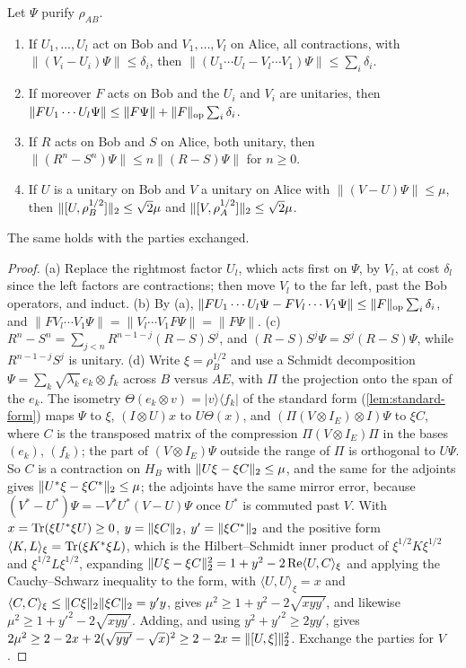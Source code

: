\begin{lemma}\label{lem:transfer-parties}
Let $\Psi$ purify $\rho_{AB}$.
\begin{enumerate}[label=(\alph*),itemsep=1pt]
\item If $U_1,\dots,U_l$ act on Bob and $V_1,\dots,V_l$ on Alice, all contractions, with $\|(V_i-U_i)\Psi\|\le\delta_i$,
then $\|(U_1\cdots U_l-V_l\cdots V_1)\Psi\|\le\sum_i\delta_i$.
\item If moreover $F$ acts on Bob and the $U_i$ and $V_i$ are unitaries, then $\|FU_1\cdots U_l\Psi\|\le\|F\Psi\|+\lVert F\rVert_{\mathrm{op}}\sum_i\delta_i$.
\item If $R$ acts on Bob and $S$ on Alice, both unitary, then $\|(R^n-S^n)\Psi\|\le n\|(R-S)\Psi\|$ for $n\ge0$.
\item If $U$ is a unitary on Bob and $V$ a unitary on Alice with $\|(V-U)\Psi\|\le\mu$, then
$\lVert [U,\rho_B^{1/2}]\rVert_2\le\sqrt2\mu$ and $\lVert [V,\rho_A^{1/2}]\rVert_2\le\sqrt2\mu$.
\end{enumerate}
The same holds with the parties exchanged.
\end{lemma}

\begin{proof}
(a) Replace the rightmost factor $U_l$, which acts first on $\Psi$, by $V_l$, at cost $\delta_l$ since the left factors
are contractions; then move $V_l$ to the far left, past the Bob operators, and induct. (b) By (a),
$\|FU_1\cdots U_l\Psi-FV_l\cdots V_1\Psi\|\le\lVert F\rVert_{\mathrm{op}}\sum_i\delta_i$, and $\|FV_l\cdots V_1\Psi\|=\|V_l\cdots V_1F\Psi\|
=\|F\Psi\|$. (c) $R^n-S^n=\sum_{j<n}R^{n-1-j}(R-S)S^j$, and $(R-S)S^j\Psi=S^j(R-S)\Psi$, while $R^{n-1-j}S^j$ is unitary.
(d) Write $\xi=\rho_B^{1/2}$ and use a Schmidt decomposition $\Psi=\sum_k\sqrt{\lambda_k}\,e_k\otimes f_k$ across $B$ versus $AE$,
with $\Pi$ the projection onto the span of the $e_k$. The isometry $\Theta(e_k\otimes v)=|v\rangle\langle f_k|$ of the standard form
(\cref{lem:standard-form}) maps $\Psi$ to $\xi$, $(I\otimes U)x$ to $U\Theta(x)$, and $(\Pi(V\otimes I_E)\otimes I)\Psi$ to $\xi C$, where $C$ is
the transposed matrix of the compression $\Pi(V\otimes I_E)\Pi$ in the bases $(e_k)$, $(f_k)$; the part of $(V\otimes I_E)\Psi$ outside
the range of $\Pi$ is orthogonal to $U\Psi$. So $C$ is a contraction on $H_B$ with
$\lVert U\xi-\xi C\rVert_2\le\mu$, and the same for the adjoints gives $\lVert U^*\xi-\xi C^*\rVert_2\le\mu$; the adjoints have the same
mirror error, because $(V^*-U^*)\Psi=-V^*U^*(V-U)\Psi$ once $U^*$ is commuted past $V$. With $x=\operatorname{Tr}(\xi U^*\xi U)\ge0$,
$y=\lVert \xi C\rVert_2$, $y'=\lVert \xi C^*\rVert_2$ and the positive form $\langle K,L\rangle_\xi=\operatorname{Tr}(\xi K^*\xi L)$, which is the Hilbert--Schmidt
inner product of $\xi^{1/2}K\xi^{1/2}$ and $\xi^{1/2}L\xi^{1/2}$, expanding $\lVert U\xi-\xi C\rVert_2^2=1+y^2-2\operatorname{Re}\langle U,C\rangle_\xi$ and
applying the Cauchy--Schwarz inequality to the form, with $\langle U,U\rangle_\xi=x$ and $\langle C,C\rangle_\xi\le\lVert C\xi\rVert_2\lVert \xi C\rVert_2=y'y$,
gives $\mu^2\ge1+y^2-2\sqrt{xyy'}$, and likewise $\mu^2\ge1+y'^2-2\sqrt{xyy'}$. Adding, and using
$y^2+y'^2\ge2yy'$, gives $2\mu^2\ge2-2x+2(\sqrt{yy'}-\sqrt x)^2\ge2-2x=\lVert [U,\xi]\rVert_2^2$. Exchange the parties for $V$.
\end{proof}


